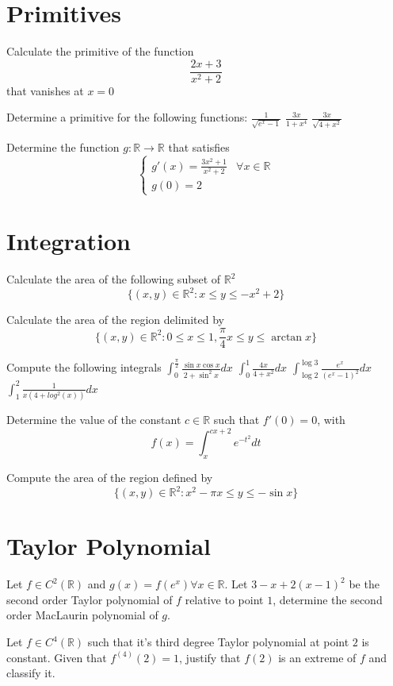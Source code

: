 \documentclass[12pt]{article}
\begin{document}
\section{Primitives}
\begin{ExerciseList}
	\Exercise Calculate the primitive of the function $$\frac{2x+3}{x^2+2}$$ that vanishes at $x=0$

	\Exercise Determine a primitive for the following functions:
	\Question $\frac{1}{\sqrt{e^x - 1}}$
	\Question $\frac{3x}{1+x^4}$
	\Question $\frac{3x}{\sqrt{4+x^2}}$

	\Exercise Determine the function $g\colon \mathbb R \to \mathbb R$ that satisfies
	$$\begin{cases}g'(x)=\frac{3x^2 + 1}{x^2 + 2} & \mbox{$\forall x\in \mathbb R$} \\ g(0)=2\end{cases}$$
\end{ExerciseList}

\section{Integration}
\begin{ExerciseList}
	\Exercise Calculate the area of the following subset of $\mathbb R^2$
	$$\{(x,y)\in\mathbb R^2 \colon x\le y\le -x^2+2\}$$

	\Exercise Calculate the area of the region delimited by
	$$\{ (x,y)\in\mathbb R^2 \colon 0\le x\le 1,\frac{\pi}{4}x\le y\le\arctan x \}$$

	\Exercise Compute the following integrals
	\Question $\int_0^{\frac{\pi}{2}}\frac{\sin x \cos x}{2+\sin^2x}dx$
	\Question $\int_0^1{\frac{4x}{4+x^2}}dx$
	\Question $\int_{\log 2}^{\log 3}{\frac{e^x}{(e^x-1)^2}}dx$
	\Question $\int_1^2{\frac{1}{x(4+log^2(x))}}dx$

	\Exercise Determine the value of the constant $c\in\mathbb R$ such that $f'(0) = 0$, with
	$$f(x)=\int_x^{cx+2}{e^{-t^2}}dt$$

	\Exercise Compute the area of the region defined by
	$$\{ (x,y)\in\mathbb R^2 \colon x^2-\pi x\le y \le -\sin{x} \}$$
\end{ExerciseList}

\section{Taylor Polynomial}
\begin{ExerciseList}
	\Exercise Let $f\in C^2(\mathbb R)$ and $g(x)=f(e^x)\forall x\in\mathbb R$.
	Let $3-x+2(x-1)^2$ be the second order Taylor polynomial of $f$ relative
	to point $1$, determine the second order MacLaurin polynomial of $g$.

	\Exercise Let $f\in C^4(\mathbb R)$ such that it's third degree Taylor
	polynomial at point $2$ is constant. Given that $f^{(4)}(2)=1$, justify that
	$f(2)$ is an extreme of $f$ and classify it.
\end{ExerciseList}
\end{document}

